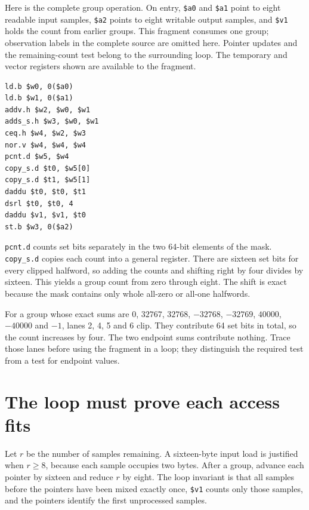 Here is the complete group operation. On entry, \texttt{\$a0} and \texttt{\$a1}
point to eight readable input samples, \texttt{\$a2} points to eight writable
output samples, and \texttt{\$v1} holds the count from earlier groups. This
fragment consumes one group; observation labels in the complete source are
omitted here. Pointer updates and the remaining-count test belong to the
surrounding loop. The temporary and vector registers shown are available
to the fragment.

\begin{verbatim}
ld.b $w0, 0($a0)
ld.b $w1, 0($a1)
addv.h $w2, $w0, $w1
adds_s.h $w3, $w0, $w1
ceq.h $w4, $w2, $w3
nor.v $w4, $w4, $w4
pcnt.d $w5, $w4
copy_s.d $t0, $w5[0]
copy_s.d $t1, $w5[1]
daddu $t0, $t0, $t1
dsrl $t0, $t0, 4
daddu $v1, $v1, $t0
st.b $w3, 0($a2)
\end{verbatim}

\texttt{pcnt.d} counts set bits separately in the two 64-bit elements of the
mask. \texttt{copy\_s.d} copies each count into a general register. There are
sixteen set bits for every clipped halfword, so adding the counts and shifting
right by four divides by sixteen. This yields a group count from zero through
eight. The shift is exact because the mask contains only whole all-zero or
all-one halfwords.

For a group whose exact sums are $0$, $32767$, $32768$, $-32768$, $-32769$,
$40000$, $-40000$ and $-1$, lanes 2, 4, 5 and 6 clip. They contribute 64 set
bits in total, so the count increases by four. The two endpoint sums contribute
nothing. Trace those lanes before using the fragment in a loop; they distinguish
the required test from a test for endpoint values.



\section{The loop must prove each access fits}

Let $r$ be the number of samples remaining. A sixteen-byte input load is justified
when $r\geq8$, because each sample occupies two bytes. After a group, advance
each pointer by sixteen and reduce $r$ by eight. The loop invariant is that all
samples before the pointers have been mixed exactly once, \texttt{\$v1} counts
only those samples, and the pointers identify the first unprocessed samples.

